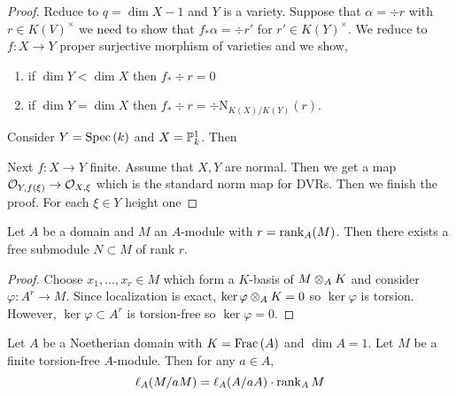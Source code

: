 \documentclass[12pt]{article}
\begin{document}
\begin{proof}
Reduce to $q = \dim{X} - 1$ and $Y$ is a variety. Suppose that $\alpha = \div{r}$ with $r \in K(V)^\times$ we need to show that $f_* \alpha = \div{r'}$ for $r' \in K(Y)^\times$. We reduce to $f : X \to Y$ proper surjective morphism of varieties and we show,
\begin{enumerate}
\item if $\dim{Y} < \dim{X}$ then $f_* \div{r} = 0$
\item if $\dim{Y} = \dim{X}$ then $f_* \div{r} = \div{\mathrm{N}_{K(X)/K(Y)}(r)}$. 
\end{enumerate}

Consider $Y = \Spec{k}$ and $X = \P^1_k$. Then 





Next $f : X \to Y$ finite. Assume that $X,Y$ are normal. Then we get a map $\stalk{Y}{f(\xi)} \to \stalk{X}{\xi}$ which is the standard norm map for DVRs. Then we finish the proof. For each $\xi \in Y$ height one
\end{proof}

\begin{lemma}
Let $A$ be a domain and $M$ an $A$-module with $r = \rank_A(M)$. Then there exists a free submodule $N \subset M$ of rank $r$.
\end{lemma}

\begin{proof}
Choose $x_1, \dots, x_r \in M$ which form a $K$-basis of $M \ot_A K$ and consider $\varphi : A^r \to M$. Since localization is exact, $\ker{\varphi} \ot_A K = 0$ so $\ker{\varphi}$ is torsion. However, $\ker{\varphi} \subset A^r$ is torsion-free so $\ker{\varphi} = 0$. 
\end{proof}

\begin{lemma}
Let $A$ be a Noetherian domain with $K = \Frac{A}$ and $\dim{A} = 1$. Let $M$ be a finite torsion-free $A$-module. Then for any $a \in A$,
\[ \ell_A(M/aM) = \ell_A(A/aA) \cdot \rank_A M \]
\end{lemma}
\end{document}
